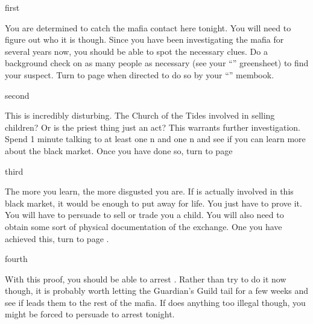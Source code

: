 \documentclass[greennotebook]{NeptuneBall}
\begin{document}

\startnotebook{\nMafia{}}

\begin{page}{first}

You are determined to catch the mafia contact here tonight. You will need to figure out who it is though. Since you have been investigating the mafia for several years now, you should be able to spot the necessary clues. Do a background check on as many people as necessary (see your ``\gBackground{\MYname}'' greensheet) to find your suspect. Turn to page  when directed to do so by your ``\nMafia{\MYname}'' membook.

\end{page}

\begin{page}{second}

This is incredibly disturbing. The Church of the Tides involved in selling children? Or is the priest thing just an act? This warrants further investigation. Spend 1 minute talking to at least one \pAtlantis{}n and one \pPacifica{}n and see if you can learn more about the black market. Once you have done so, turn to page 

\end{page}

\begin{page}{third}

The more you learn, the more disgusted you are. If \cPriest{} is actually involved in this black market, it would be enough to put \cPriest{\them} away for life. You just have to prove it. You will have to persuade \cPriest{} to sell or trade you a child. You will also need to obtain some sort of physical documentation of the exchange. One you have achieved this, turn to page .

\end{page}

\begin{page}{fourth}

With this proof, you should be able to arrest \cPriest{}. Rather than try to do it now though, it is probably worth letting the Guardian's Guild tail  for a few  weeks and see if \cPriest{} leads them to the rest of the mafia. If \cPriest{} does anything too illegal though, you might be forced to persuade \cKing{} to arrest \cPriest{} tonight.

\end{page}

\endnotebook
\end{document}
